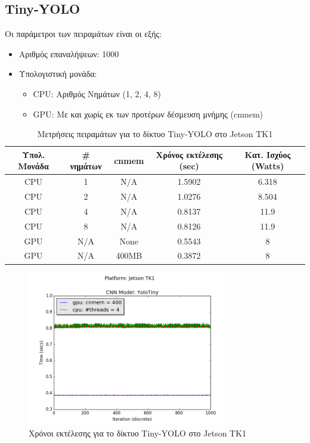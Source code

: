 
\subsection{Tiny-YOLO}

Οι παράμετροι των πειραμάτων είναι οι εξής:
\begin{itemize}
  \item{Αριθμός επαναλήψεων: 1000}
  \item{Υπολογιστική μονάδα:}
    \begin{itemize}
      \item{CPU: Αριθμός Νημάτων (1, 2, 4, 8)}
      \item{GPU: Με και χωρίς εκ των προτέρων δέσμευση μνήμης (cnmem)}
    \end{itemize}
\end{itemize}

\begin{table}[!ht]
  \begin{center}
    \caption{Μετρήσεις πειραμάτων για το δίκτυο Tiny-YOLO στο Jetson TK1}
    \label{tab:yolo_jetson}
    \small
    \begin{tabular}[center]{ | c | c | c | c | c | }
      \hline
      \rowcolor{Gray}
      Υπολ. Μονάδα & \# νημάτων & cnmem & Χρόνος εκτέλεσης (sec) & Κατ. Ισχύος (Watts) \\
      \hline
      CPU & 1 & N/A & 1.5902 & 6.318\\
      CPU & 2 & N/A & 1.0276 & 8.504\\
      CPU & 4 & N/A & 0.8137 & 11.9\\
      CPU & 8 & N/A & 0.8126 & 11.9\\
      GPU & N/A & None & 0.5543 & 8\\
      GPU & N/A & 400MB & 0.3872 & 8\\
      \hline
    \end{tabular}
  \end{center}
\end{table}

\begin{figure}[!ht]
  \centering
  \includegraphics[width=0.8\textwidth]{./images/chapter6/benchmark_yolotiny_jetson.png}
  \caption[Χρόνoι εκτέλεσης για το δίκτυο Tiny-YOLO στο Jetson TK1]{Χρόνοι εκτέλεσης για το δίκτυο Tiny-YOLO στο Jetson TK1}
  \label{fig:yolotiny_results_jetson}
\end{figure}

